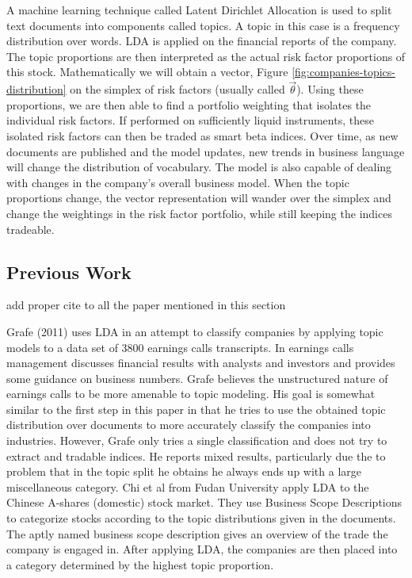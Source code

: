 \documentclass[12pt,journal,letterpaper,oneside,onecolumn]{IEEEtran}
\begin{document}
A machine learning technique called Latent Dirichlet Allocation is
used to split text documents into components called topics.
A topic in this case is a frequency distribution over words.
LDA is applied on the financial reports of the company.
The topic proportions are then interpreted as the actual risk factor proportions of this stock.
Mathematically we will obtain a vector, Figure \ref{fig:companies-topics-distribution} on the simplex of risk factors (usually called $\vec{\theta}$).
Using these proportions, we are then able to find a portfolio weighting that isolates the individual risk factors.
If performed on sufficiently liquid instruments, these isolated risk factors can then be traded as smart beta indices.
Over time, as new documents are published and the model updates, new trends in business language will change the distribution of vocabulary. 
The model is also capable of dealing with changes in the company's overall business model. When the topic proportions change, the vector representation will wander over the simplex and change the weightings in the risk factor portfolio, while still keeping the indices tradeable.

\subsection{Previous Work}
 add proper cite to all the paper mentioned in this section

Grafe (2011) uses LDA in an attempt to classify companies by applying topic models to a data set of 3800 earnings calls transcripts. In earnings calls management discusses financial results with analysts and investors and
provides some guidance on business numbers.
Grafe believes the unstructured nature of earnings calls to be more amenable to
topic modeling.
His goal is somewhat similar to the first step in this paper in that he tries to use
the obtained topic distribution over documents to more accurately classify the
companies into industries. However, Grafe only tries a single classification and does
not try to extract and tradable indices.
He reports mixed results, particularly due the to problem that in the topic split he obtains he always ends up with a large miscellaneous category.
Chi et al from Fudan University apply LDA to the Chinese A-shares (domestic) stock market. They use Business Scope Descriptions to categorize stocks according to the topic distributions given in the documents. The aptly named business scope
description gives an overview of the trade the company is engaged in. After applying
LDA, the companies are then placed into a category determined by the highest topic
proportion.
\end{document}
